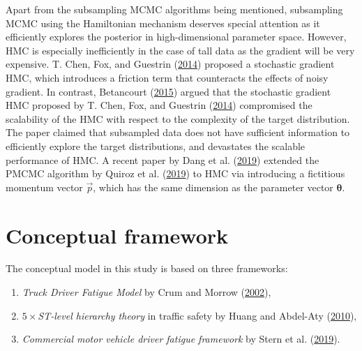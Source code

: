 \documentclass[12pt]{book}
\numberwithin{equation}{chapter}
\providecommand{\tightlist}{%
  \setlength{\itemsep}{0pt}\setlength{\parskip}{0pt}}
\begin{document}
Apart from the subsampling MCMC algorithms being mentioned, subsampling MCMC using the Hamiltonian mechanism deserves special attention as it efficiently explores the posterior in high-dimensional parameter space. However, HMC is especially inefficiently in the case of tall data as the gradient will be very expensive. T. Chen, Fox, and Guestrin (\protect\hyperlink{ref-chen2014stochastic}{2014}) proposed a stochastic gradient HMC, which introduces a friction term that counteracts the effects of noisy gradient. In contrast, Betancourt (\protect\hyperlink{ref-betancourt2015fundamental}{2015}) argued that the stochastic gradient HMC proposed by T. Chen, Fox, and Guestrin (\protect\hyperlink{ref-chen2014stochastic}{2014}) compromised the scalability of the HMC with respect to the complexity of the target distribution. The paper claimed that subsampled data does not have sufficient information to efficiently explore the target distributions, and devastates the scalable performance of HMC. A recent paper by Dang et al. (\protect\hyperlink{ref-dang2019hamiltonian}{2019}) extended the PMCMC algorithm by Quiroz et al. (\protect\hyperlink{ref-quiroz2019speeding}{2019}) to HMC via introducing a fictitious momentum vector \(\vec{p}\), which has the same dimension as the parameter vector \(\mathbf{\theta}\).

\hypertarget{conceptual-framework}{%
\section{Conceptual framework}\label{conceptual-framework}}

The conceptual model in this study is based on three frameworks:

\begin{enumerate}
\def\labelenumi{\arabic{enumi}.}
\tightlist
\item
  \emph{Truck Driver Fatigue Model} by Crum and Morrow (\protect\hyperlink{ref-crum2002influence}{2002}),
\item
  \emph{\(5 \times\)ST-level hierarchy theory} in traffic safety by Huang and Abdel-Aty (\protect\hyperlink{ref-huang2010multilevel}{2010}),
\item
  \emph{Commercial motor vehicle driver fatigue framework} by Stern et al. (\protect\hyperlink{ref-stern2019data}{2019}).
\end{enumerate}
\end{document}
